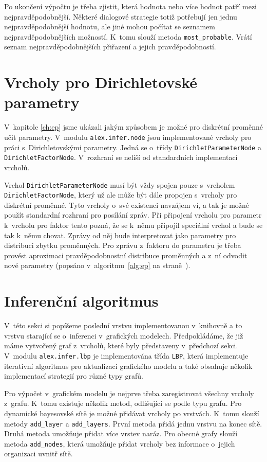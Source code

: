 Po ukončení výpočtu je třeba zjistit, která hodnota nebo více hodnot patří mezi nejpravděpodobnější.
Některé dialogové strategie totiž potřebují jen jednu nejpravděpodobnější hodnotu, ale jiné mohou počítat se seznamem nejpravděpodobnějších možností. 
K~tomu slouží metoda \texttt{most\_probable}.
Vrátí seznam nejpravděpodobnějších přiřazení a jejich pravděpodobností.

\section{Vrcholy pro Dirichletovské parametry}
\label{sec:vrdir}

V~kapitole \ref{ch:ep} jsme ukázali jakým způsobem je možné pro diskrétní proměnné učit parametry.
V~modulu \texttt{alex.infer.node} jsou implementované vrcholy pro práci s~Dirichletovskými parametry.
Jedná se o~třídy \texttt{DirichletParameterNode} a \texttt{DirichletFactorNode}.
V~rozhraní se neliší od standardních implementací vrcholů.

Vrchol \texttt{DirichletParameterNode} musí být vždy spojen pouze s~vrcholem \texttt{DirichletFactorNode}, který už ale může být dále propojen s~vrcholy pro diskrétní proměnné.
Tyto vrcholy o~své existenci navzájem ví, a tak je možné použít standardní rozhraní pro posílání zpráv.
Při připojení vrcholu pro parametr k~vrcholu pro faktor tento pozná, že se k~němu připojil speciální vrchol a bude se tak k~němu chovat.
Zprávy od něj bude interpretovat jako parametry pro distribuci zbytku proměnných.
Pro zprávu z~faktoru do parametru je třeba provést aproximaci pravděpodobnostní distribuce proměnných a z~ní odvodit nové parametry (popsáno v~algoritmu~\ref{alg:ep} na straně~\pageref{alg:ep}).

\section{Inferenční algoritmus}

V~této sekci si popíšeme poslední vrstvu implementovanou v~knihovně a to vrstvu starající se o~inferenci v~grafických modelech.
Předpokládáme, že již máme vytvořený graf z~vrcholů, které byly představeny v~předchozí sekci.
V~modulu \texttt{alex.infer.lbp} je implementována třída \texttt{LBP}, která implementuje iterativní algoritmus pro aktualizaci grafického modelu a také obsahuje několik implementací strategií pro různé typy grafů.

Pro výpočet v~grafickém modelu je nejprve třeba zaregistrovat všechny vrcholy z~grafu.
K~tomu existuje několik metod, odlišující se podle typu grafu.
Pro dynamické bayesovské sítě je možné přidávat vrcholy po vrstvách.
K~tomu slouží metody \texttt{add\_layer} a \texttt{add\_layers}.
První metoda přidá jednu vrstvu na konec sítě.
Druhá metoda umožňuje přidat více vrstev naráz.
Pro obecné grafy slouží metoda \texttt{add\_nodes}, která umožňuje přidat vrcholy bez informace o~jejich organizaci uvnitř sítě.

